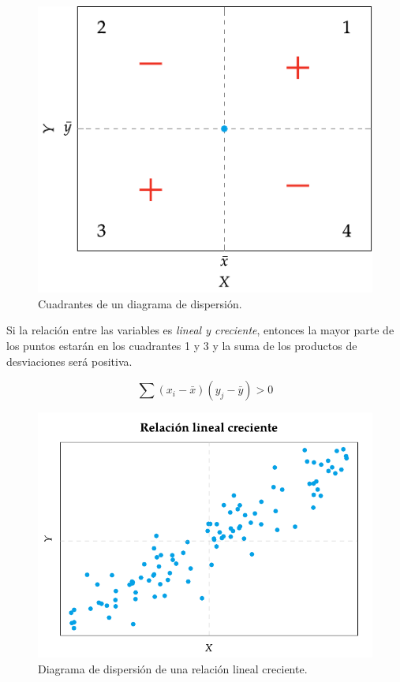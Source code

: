 \documentclass[
  a4paper,
]{scrreport}
\theoremstyle{plain}
\theoremstyle{definition}
\theoremstyle{definition}
\theoremstyle{remark}
\begin{document}
\begin{figure}[H]

{\centering \includegraphics{img/regresion/cuadrantes_diagrama_dispersion.pdf}

}

\caption{Cuadrantes de un diagrama de dispersión.}

\end{figure}%

Si la relación entre las variables es \emph{lineal y creciente},
entonces la mayor parte de los puntos estarán en los cuadrantes 1 y 3 y
la suma de los productos de desviaciones será positiva.

\[\sum(x_i-\bar x)(y_j-\bar y) > 0\]

\begin{figure}[H]

{\centering \includegraphics{img/regresion/diagrama_dispersion_lineal_creciente.pdf}

}

\caption{Diagrama de dispersión de una relación lineal creciente.}

\end{figure}%
\end{document}
